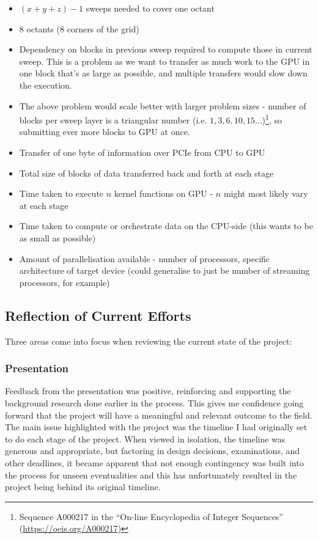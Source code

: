\documentclass[conference]{IEEEtran}
\begin{document}
\begin{itemize}
\item $ (x + y + z) - 1 $ sweeps needed to cover one octant
\item 8 octants (8 corners of the grid)
\item Dependency on blocks in previous sweep required to compute those in current sweep. This is a problem as we want to transfer as much work to the GPU in one block that's as large as possible, and multiple transfers would slow down the execution.
\item The above problem would scale better with larger problem sizes - number of blocks per sweep layer is a triangular number (i.e. $ 1, 3, 6, 10, 15...$)\footnote{Sequence A000217 in the ``On-line Encyclopedia of Integer Sequences'' (\url{https://oeis.org/A000217})}, so submitting ever more blocks to GPU at once.
\item Transfer of one byte of information over PCIe from CPU to GPU
\item Total size of blocks of data transferred back and forth at each stage
\item Time taken to execute $ n $ kernel functions on GPU - $ n $ might most likely vary at each stage
\item Time taken to compute or orchestrate data on the CPU-side (this wants to be as small as possible)
\item Amount of parallelisation available - number of processors, specific architecture of target device (could generalise to just be number of streaming processors, for example)
\end{itemize}

\subsection{Reflection of Current Efforts}

Three areas come into focus when reviewing the current state of the project:

\subsubsection{Presentation}

Feedback from the presentation was positive, reinforcing and supporting the background research done earlier in the process. This gives me confidence going forward that the project will have a meaningful and relevant outcome to the field. The main issue highlighted with the project was the timeline I had originally set to do each stage of the project. When viewed in isolation, the timeline was generous and appropriate, but factoring in design decisions, examinations, and other deadlines, it became apparent that not enough contingency was built into the process for unseen eventualities and this has unfortunately resulted in the project being behind its original timeline. 
\end{document}
